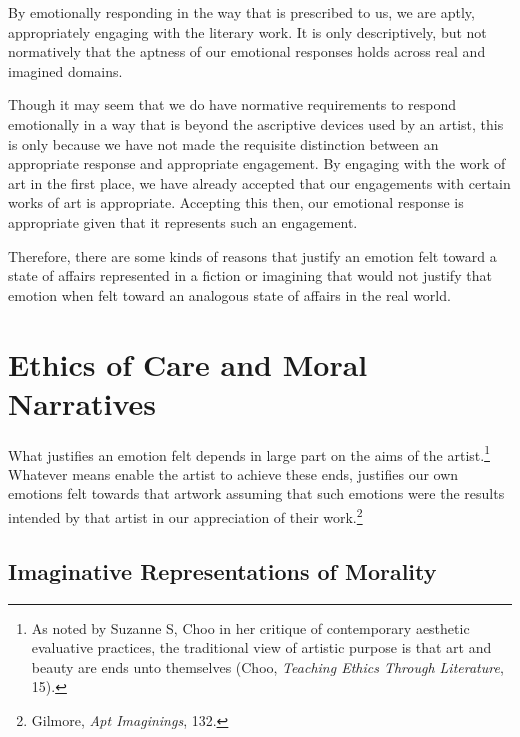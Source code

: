 \documentclass[
  12pt,
]{book}
\theoremstyle{definition}
\theoremstyle{definition}
\theoremstyle{definition}
\theoremstyle{definition}
\theoremstyle{remark}
\begin{document}
By emotionally responding in the way that is prescribed to us, we are aptly, appropriately engaging with the literary work. It is only descriptively, but not normatively that the aptness of our emotional responses holds across real and imagined domains.

Though it may seem that we do have normative requirements to respond emotionally in a way that is beyond the ascriptive devices used by an artist, this is only because we have not made the requisite distinction between an appropriate response and appropriate engagement. By engaging with the work of art in the first place, we have already accepted that our engagements with certain works of art is appropriate. Accepting this then, our emotional response is appropriate given that it represents such an engagement.

Therefore, there are some kinds of reasons that justify an emotion felt toward a state of affairs represented in a fiction or imagining that would not justify that emotion when felt toward an analogous state of affairs in the real world.

\section{Ethics of Care and Moral Narratives}\label{ethics-of-care-and-moral-narratives}

What justifies an emotion felt depends in large part on the aims of the artist.\footnote{As noted by Suzanne S, Choo in her critique of contemporary aesthetic evaluative practices, the traditional view of artistic purpose is that art and beauty are ends unto themselves (Choo, \emph{Teaching Ethics Through Literature}, 15).} Whatever means enable the artist to achieve these ends, justifies our own emotions felt towards that artwork assuming that such emotions were the results intended by that artist in our appreciation of their work.\footnote{Gilmore, \emph{Apt {Imaginings}}, 132.}

\subsection*{Imaginative Representations of Morality}\label{imaginative-representations-of-morality}
\end{document}
